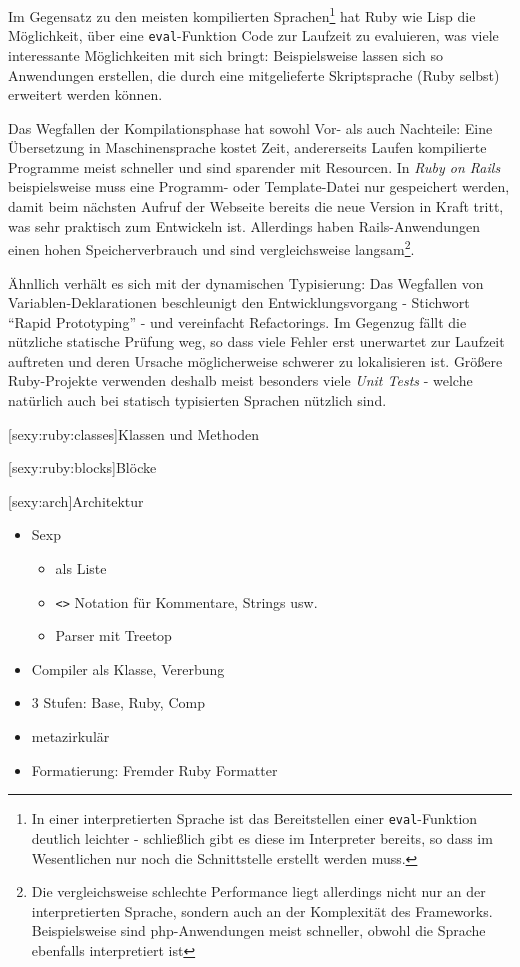 \documentclass[a4paper, bibgerm]{book}
\newcommand\icode[1]{\lstinline?#1?}
\newcommand\lsection{}
\newcommand\lsubsection{}
\begin{document}
Im Gegensatz zu den meisten kompilierten Sprachen\footnote{In einer
  interpretierten Sprache ist das Bereitstellen einer
  \icode{eval}-Funktion deutlich leichter - schließlich gibt es diese im
Interpreter bereits, so dass im Wesentlichen nur noch die Schnittstelle
erstellt werden muss.} hat Ruby wie Lisp die
Möglichkeit, über eine \icode{eval}-Funktion Code zur Laufzeit zu
evaluieren, was viele interessante Möglichkeiten mit sich bringt:
Beispielsweise lassen sich so Anwendungen erstellen, die durch eine
mitgelieferte Skriptsprache (Ruby selbst) erweitert werden können.

Das Wegfallen der Kompilationsphase hat sowohl Vor- als auch Nachteile:
Eine Übersetzung in Maschinensprache kostet Zeit, andererseits Laufen
kompilierte Programme meist schneller und sind sparender mit
Resourcen. In \textit{Ruby on Rails} beispielsweise muss eine Programm-
oder Template-Datei nur gespeichert werden, damit beim nächsten Aufruf
der Webseite bereits die neue Version in Kraft tritt, was sehr praktisch
zum Entwickeln ist. Allerdings haben Rails-Anwendungen einen hohen
Speicherverbrauch und sind vergleichsweise langsam\footnote{Die
  vergleichsweise schlechte Performance liegt allerdings nicht nur an
  der interpretierten Sprache, sondern auch an der Komplexität des
  Frameworks. Beispielsweise sind php-Anwendungen meist schneller,
  obwohl die Sprache ebenfalls interpretiert ist}.

Ähnllich verhält es sich mit der dynamischen Typisierung: Das Wegfallen
von Variablen-Deklarationen beschleunigt den Entwicklungsvorgang -
Stichwort "`Rapid Prototyping"' - und vereinfacht Refactorings. Im
Gegenzug fällt die nützliche statische Prüfung weg, so dass viele Fehler
erst unerwartet zur Laufzeit auftreten und deren Ursache möglicherweise
schwerer zu lokalisieren ist. Größere Ruby-Projekte verwenden deshalb meist
besonders viele \textit{Unit Tests} - welche natürlich auch bei statisch
typisierten Sprachen nützlich sind.

\lsubsection[sexy:ruby:classes]{Klassen und Methoden}

\lsubsection[sexy:ruby:blocks]{Blöcke}

\lsection[sexy:arch]{Architektur}

\begin{itemize}
\item Sexp
  \begin{itemize}
  \item als Liste
  \item \icode{<>} Notation für Kommentare, Strings usw.
  \item Parser mit Treetop
  \end{itemize}
\item Compiler als Klasse, Vererbung
\item 3 Stufen: Base, Ruby, Comp
\item metazirkulär
\item Formatierung: Fremder Ruby Formatter
\end{itemize}
\end{document}
